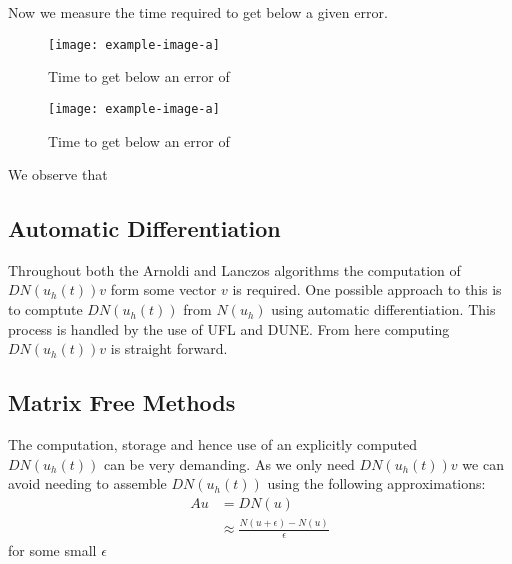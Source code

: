 Now we measure the time required to get below a given error.
\begin{figure}[H]
    \centering
    \begin{minipage}{0.49\textwidth}
        \texttt{[image: example-image-a]} %
        \caption{Time to get below an error of}
        \label{fig:ETKrylov1}
    \end{minipage}\hfill
    \centering
    \begin{minipage}{0.49\textwidth}
        \texttt{[image: example-image-a]} %
        \caption{Time to get below an error of}
        \label{fig:ETKrylov2}
    \end{minipage}\hfill
\end{figure}
We observe that 

\subsection{Automatic Differentiation}
Throughout both the Arnoldi and Lanczos algorithms the computation of $DN(u_h(t))v$ form some vector $v$ is required.
One possible approach to this is to comptute $DN(u_h(t))$ from $N(u_h)$ using automatic differentiation.
This process is handled by the use of UFL\cite{Alnaes2014} and DUNE\cite{Bastian2021}.
From here computing $DN(u_h(t))v$ is straight forward.

\subsection{Matrix Free Methods}
The computation, storage and hence use of an explicitly computed $DN(u_h(t))$ can be very demanding.
As we only need $DN(u_h(t))v$ we can avoid needing to assemble $DN(u_h(t))$ using the following approximations:
\begin{align*}
    Au &= DN(u)\\
    &\approx \frac{N(u+\epsilon)-N(u)}{\epsilon}
\end{align*}
for some small $\epsilon$